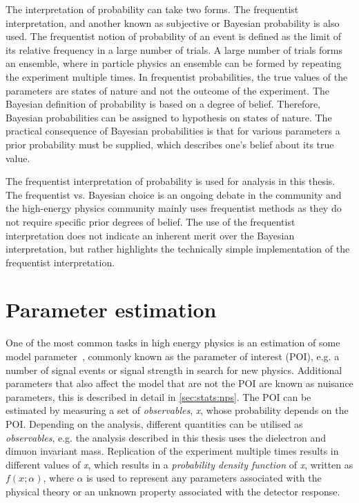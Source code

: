 The interpretation of probability can take two forms. The frequentist interpretation, and another known as subjective or Bayesian probability is also used. The frequentist notion of probability of an event is defined as the limit of its relative frequency in a large number of trials. A large number of trials forms an ensemble, where in particle physics an ensemble can be formed by repeating the experiment multiple times. In frequentist probabilities, the true values of the parameters are states of nature and not the outcome of the experiment. The Bayesian definition of probability is based on a degree of belief. Therefore, Bayesian probabilities can be assigned to hypothesis on states of nature. The practical consequence of Bayesian probabilities is that for various parameters a prior probability must be supplied, which describes one's belief about its true value. 

The frequentist interpretation of probability is used for analysis in this thesis. The frequentist vs. Bayesian choice is an ongoing debate in the community and the high-energy physics community mainly uses frequentist methods as they do not require specific prior degrees of belief. The use of the frequentist interpretation does not indicate an inherent merit over the Bayesian interpretation, but rather highlights the technically simple implementation of the frequentist interpretation.

\section{Parameter estimation}\label{sec:stats:param}
One of the most common tasks in high energy physics is an estimation of some model parameter~\cite{Cowan1998}, commonly known as the parameter of interest (POI), e.g. a number of signal events or signal strength in search for new physics. Additional parameters that also affect the model that are not the POI are known as nuisance parameters, this is described in detail in \cref{sec:stats:nps}. The POI can be estimated by measuring a set of \emph{observables}, \emph{x}, whose probability depends on the POI. Depending on the analysis, different quantities can be utilised as \emph{observables}, e.g. the analysis described in this thesis uses the dielectron and dimuon invariant mass. Replication of the experiment multiple times results in different values of \emph{x}, which results in a \emph{probability density function} of \emph{x}, written as $f(x;\alpha)$, where $\alpha$ is used to represent any parameters associated with the physical theory or an unknown property associated with the detector response. 

